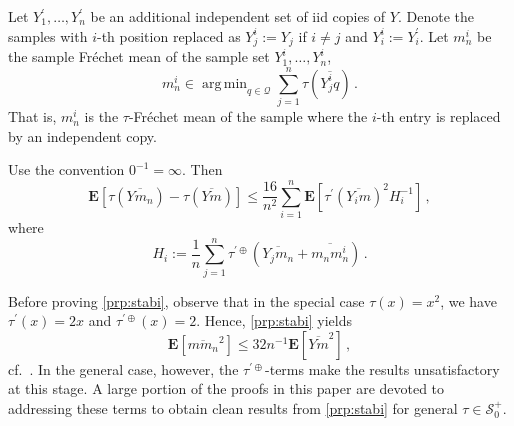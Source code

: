 \documentclass{article}
\newcommand*{\mc}[1]{\mathcal{#1}}
\newcommand{\lab}{\left[} %
\newcommand{\rab}{\right]} %
\newcommand{\ab}[1]{\lab #1 \rab} %
\newcommand{\abOf}[1]{\!\ab{#1}} %
\newcommand{\lb}{\left(} %
\newcommand{\rb}{\right)} %
\newcommand{\br}[1]{\lb #1 \rb} %
\newcommand{\brOf}[1]{\!\br{#1}} %
\newcommand{\E}{\mathbf{E}} %
\newcommand{\EOf}[1]{\E\abOf{#1}}
\newcommand{\pr}{^\prime}
\newcommand{\eqcm}{\,,} %
\newcommand{\eqfs}{\,.}
\DeclareMathOperator*{\argmin}{arg\,min}
\newcommand{\ol}[2]{\overline{#1#2}}
\newcommand{\tran}{\tau}
\newcommand{\dtran}{\tau\pr}
\newcommand{\ddrtran}{\tau^{\prime\oplus}}
\newcommand{\setcciz}{\mc S_0^+}
\begin{document}
Let $Y_1\pr, \dots, Y_n\pr$ be an additional independent set of iid copies of $Y$.
Denote the samples with $i$-th position replaced as $Y_j^i := Y_j$ if $i \neq j$ and $Y_i^i := Y_i\pr$.
Let $m_n^i$ be the sample Fr\'echet mean of the sample set $Y_1^i, \dots, Y_n^i$, 
\begin{equation}
    m_n^i \in \argmin_{q\in\mc Q} \sum_{j=1}^n \tran(\ol {Y_j^i}q)
    \eqfs
\end{equation}
That is, $m_n^i$ is the $\tran$-Fr\'echet mean of the sample where the $i$-th entry is replaced by an independent copy.
%
\begin{proposition}\label{prp:stabi}
	Use the convention $0^{-1} = \infty$.
	Then
	\begin{equation}
		\EOf{\tran(\ol Y{m_n}) - \tran(\ol Ym)}
        \leq
        \frac{16}{n^2} \sum_{i=1}^n \EOf{\dtran(\ol {Y_i}m)^2 H_i^{-1}}
		\eqcm
	\end{equation}
	where
	\begin{equation}
		H_i := \frac1n \sum_{j=1}^n \ddrtran\brOf{\ol {Y_j}{m_n} + \ol {m_n}{m_n^i}}
		\eqfs
	\end{equation}
\end{proposition}
%
Before proving \cref{prp:stabi}, observe that in the special case $\tran(x) = x^2$, we have $\dtran(x) = 2x$ and $\ddrtran(x) = 2$. Hence, \cref{prp:stabi} yields
\begin{equation}
	\EOf{\ol m{m_n}^2} \leq 32 n^{-1} \EOf{\ol {Y}m^2}
	\eqcm
\end{equation}
cf.\ \cite[Theorem 3]{brunel2025}. In the general case, however, the $\ddrtran$-terms make the results unsatisfactory at this stage. A large portion of the proofs in this paper are devoted to addressing these terms to obtain clean results from \cref{prp:stabi} for general $\tran \in \setcciz$.
\end{document}
